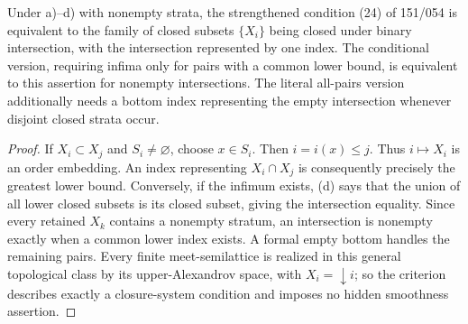 \begin{result}\label{A4.4}
Under a)--d) with nonempty strata, the strengthened condition (24) of
151/054 is equivalent to the family of closed subsets $\{X_i\}$ being
closed under binary intersection, with the intersection represented by
one index. The conditional version, requiring infima only for pairs
with a common lower bound, is equivalent to this assertion for nonempty
intersections. The literal all-pairs version additionally needs a
bottom index representing the empty intersection whenever disjoint
closed strata occur.
\end{result}
\begin{proof}
If $X_i\subset X_j$ and $S_i\ne\varnothing$, choose $x\in S_i$.
Then $i=i(x)\leq j$. Thus $i\mapsto X_i$ is an order embedding.
An index representing $X_i\cap X_j$ is consequently precisely the
greatest lower bound. Conversely, if the infimum exists, (d) says that
the union of all lower closed subsets is its closed subset, giving the
intersection equality. Since every retained $X_k$ contains a nonempty
stratum, an intersection is nonempty exactly when a common lower
index exists. A formal empty bottom handles the remaining pairs.
Every finite meet-semilattice is realized in this general topological
class by its upper-Alexandrov space, with $X_i=\downarrow i$; so the
criterion describes exactly a closure-system condition and imposes
no hidden smoothness assertion.
\end{proof}

